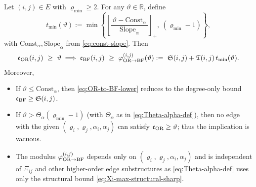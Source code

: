 \documentclass[twoside,11pt]{article}
\numberwithin{equation}{section}
\numberwithin{theorem}{section}
\numberwithin{example}{section}
\begin{document}
\begin{theorem}
\label{thm:OR-to-BF-lower}
Let $(i,j)\in E$ with $\varrho_{\min}\ge 2$. For any $\vartheta\in\mathbb R$, define
\begin{equation}\label{eq:tmin}
t_{\min}(\vartheta):=\min \left\{ \left[\frac{\ \vartheta-\mathrm{Const}_\alpha\ }{\ \mathrm{Slope}_\alpha\ }\right]_+,\ \left(\varrho_{\min}-1\right)\right\},
\end{equation}
with $\mathrm{Const}_\alpha,\mathrm{Slope}_\alpha$ from \eqref{eq:const-slope}. Then
\begin{equation}\label{eq:OR-to-BF-lower}
\mathfrak c_{\rm OR}(i,j)\ \ge\ \vartheta
\implies
\mathfrak c_{\rm BF}(i,j)\ \ge\ \varphi_{\rm OR\to BF}^{(i,j)}(\vartheta):=\ \mathfrak S(i,j)+\mathfrak T(i,j)\,t_{\min}(\vartheta).
\end{equation}
Moreover,
\begin{itemize}
\item[{\rm (a)}] If $\vartheta\le \mathrm{Const}_\alpha$, then \eqref{eq:OR-to-BF-lower} reduces to the degree-only bound $\mathfrak c_{\rm BF}\ge \mathfrak S(i,j)$.
\item[{\rm (b)}] If $\vartheta>\Theta_\alpha(\varrho_{\min}-1)$ (with $\Theta_\alpha$ as in \eqref{eq:Theta-alpha-def}), then no edge with the given $(\varrho_i,\varrho_j,\alpha_i,\alpha_j)$ can satisfy $\mathfrak c_{\rm OR}\ge\vartheta$; thus the implication is vacuous.
\item[{\rm (c)}] The modulus $\varphi^{(i,j)}_{\rm OR\to BF}$ depends only on $(\varrho_i,\varrho_j,\alpha_i,\alpha_j)$ and is independent of $\Xi_{ij}$ and other higher-order edge substructures as \eqref{eq:Theta-alpha-def} uses only the structural bound \eqref{eq:Xi-max-structural-sharp}.
\end{itemize}
\end{theorem}
\end{document}
